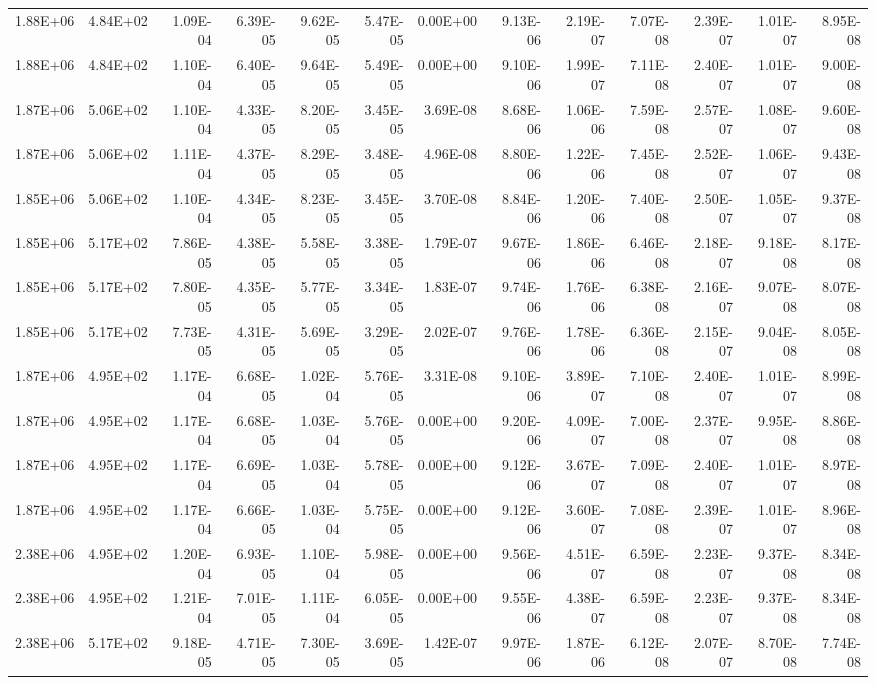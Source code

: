 \begin{tabular}{rrrrrrrrrrrrr}
1.88E+06 & 4.84E+02 & 1.09E-04 & 6.39E-05 & 9.62E-05 & 5.47E-05 & 0.00E+00 & 9.13E-06 & 2.19E-07 & 7.07E-08 & 2.39E-07 & 1.01E-07 & 8.95E-08 \\
1.88E+06 & 4.84E+02 & 1.10E-04 & 6.40E-05 & 9.64E-05 & 5.49E-05 & 0.00E+00 & 9.10E-06 & 1.99E-07 & 7.11E-08 & 2.40E-07 & 1.01E-07 & 9.00E-08 \\
1.87E+06 & 5.06E+02 & 1.10E-04 & 4.33E-05 & 8.20E-05 & 3.45E-05 & 3.69E-08 & 8.68E-06 & 1.06E-06 & 7.59E-08 & 2.57E-07 & 1.08E-07 & 9.60E-08 \\
1.87E+06 & 5.06E+02 & 1.11E-04 & 4.37E-05 & 8.29E-05 & 3.48E-05 & 4.96E-08 & 8.80E-06 & 1.22E-06 & 7.45E-08 & 2.52E-07 & 1.06E-07 & 9.43E-08 \\
1.85E+06 & 5.06E+02 & 1.10E-04 & 4.34E-05 & 8.23E-05 & 3.45E-05 & 3.70E-08 & 8.84E-06 & 1.20E-06 & 7.40E-08 & 2.50E-07 & 1.05E-07 & 9.37E-08 \\
1.85E+06 & 5.17E+02 & 7.86E-05 & 4.38E-05 & 5.58E-05 & 3.38E-05 & 1.79E-07 & 9.67E-06 & 1.86E-06 & 6.46E-08 & 2.18E-07 & 9.18E-08 & 8.17E-08 \\
1.85E+06 & 5.17E+02 & 7.80E-05 & 4.35E-05 & 5.77E-05 & 3.34E-05 & 1.83E-07 & 9.74E-06 & 1.76E-06 & 6.38E-08 & 2.16E-07 & 9.07E-08 & 8.07E-08 \\
1.85E+06 & 5.17E+02 & 7.73E-05 & 4.31E-05 & 5.69E-05 & 3.29E-05 & 2.02E-07 & 9.76E-06 & 1.78E-06 & 6.36E-08 & 2.15E-07 & 9.04E-08 & 8.05E-08 \\
1.87E+06 & 4.95E+02 & 1.17E-04 & 6.68E-05 & 1.02E-04 & 5.76E-05 & 3.31E-08 & 9.10E-06 & 3.89E-07 & 7.10E-08 & 2.40E-07 & 1.01E-07 & 8.99E-08 \\
1.87E+06 & 4.95E+02 & 1.17E-04 & 6.68E-05 & 1.03E-04 & 5.76E-05 & 0.00E+00 & 9.20E-06 & 4.09E-07 & 7.00E-08 & 2.37E-07 & 9.95E-08 & 8.86E-08 \\
1.87E+06 & 4.95E+02 & 1.17E-04 & 6.69E-05 & 1.03E-04 & 5.78E-05 & 0.00E+00 & 9.12E-06 & 3.67E-07 & 7.09E-08 & 2.40E-07 & 1.01E-07 & 8.97E-08 \\
1.87E+06 & 4.95E+02 & 1.17E-04 & 6.66E-05 & 1.03E-04 & 5.75E-05 & 0.00E+00 & 9.12E-06 & 3.60E-07 & 7.08E-08 & 2.39E-07 & 1.01E-07 & 8.96E-08 \\
2.38E+06 & 4.95E+02 & 1.20E-04 & 6.93E-05 & 1.10E-04 & 5.98E-05 & 0.00E+00 & 9.56E-06 & 4.51E-07 & 6.59E-08 & 2.23E-07 & 9.37E-08 & 8.34E-08 \\
2.38E+06 & 4.95E+02 & 1.21E-04 & 7.01E-05 & 1.11E-04 & 6.05E-05 & 0.00E+00 & 9.55E-06 & 4.38E-07 & 6.59E-08 & 2.23E-07 & 9.37E-08 & 8.34E-08 \\
2.38E+06 & 5.17E+02 & 9.18E-05 & 4.71E-05 & 7.30E-05 & 3.69E-05 & 1.42E-07 & 9.97E-06 & 1.87E-06 & 6.12E-08 & 2.07E-07 & 8.70E-08 & 7.74E-08 \\

\end{tabular}
